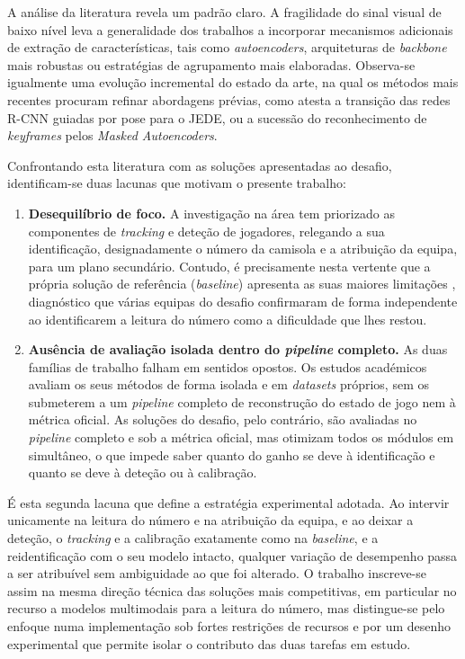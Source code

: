 A análise da literatura revela um padrão claro. A fragilidade do sinal visual de baixo
nível leva a generalidade dos trabalhos a incorporar mecanismos adicionais de extração de
características, tais como \emph{autoencoders}, arquiteturas de \emph{backbone} mais
robustas ou estratégias de agrupamento mais elaboradas. Observa-se igualmente uma
evolução incremental do estado da arte, na qual os métodos mais recentes procuram refinar
abordagens prévias, como atesta a transição das redes R-CNN guiadas por pose para o JEDE,
ou a sucessão do reconhecimento de \emph{keyframes} pelos \emph{Masked Autoencoders}.

Confrontando esta literatura com as soluções apresentadas ao desafio, identificam-se duas
lacunas que motivam o presente trabalho:

\begin{enumerate}
    \item \textbf{Desequilíbrio de foco.} A investigação na área tem priorizado as
    componentes de \emph{tracking} e deteção de jogadores, relegando a sua identificação,
    designadamente o número da camisola e a atribuição da equipa, para um plano
    secundário. Contudo, é precisamente nesta vertente que a própria solução de referência
    (\emph{baseline}) apresenta as suas maiores limitações \citep{somers2024soccernet},
    diagnóstico que várias equipas do desafio confirmaram de forma independente ao
    identificarem a leitura do número como a dificuldade que lhes restou.

    \item \textbf{Ausência de avaliação isolada dentro do \emph{pipeline} completo.} As
    duas famílias de trabalho falham em sentidos opostos. Os estudos académicos avaliam os
    seus métodos de forma isolada e em \emph{datasets} próprios, sem os submeterem a um
    \emph{pipeline} completo de reconstrução do estado de jogo nem à métrica oficial. As
    soluções do desafio, pelo contrário, são avaliadas no \emph{pipeline} completo e sob a
    métrica oficial, mas otimizam todos os módulos em simultâneo, o que impede saber quanto
    do ganho se deve à identificação e quanto se deve à deteção ou à calibração.
\end{enumerate}

É esta segunda lacuna que define a estratégia experimental adotada. Ao intervir unicamente
na leitura do número e na atribuição da equipa, e ao deixar a deteção, o \emph{tracking} e a
calibração exatamente como na \emph{baseline}, e a reidentificação com o seu modelo intacto,
qualquer variação de desempenho passa a ser atribuível sem ambiguidade ao que foi alterado. O trabalho
inscreve-se assim na mesma direção técnica das soluções mais competitivas, em particular no
recurso a modelos multimodais para a leitura do número, mas distingue-se pelo enfoque numa
implementação sob fortes restrições de recursos e por um desenho experimental que permite
isolar o contributo das duas tarefas em estudo.
